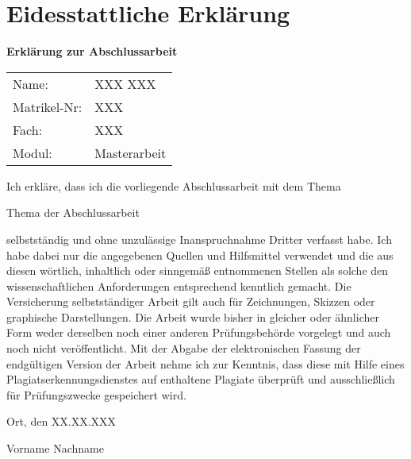 \chapter{Eidesstattliche Erklärung}
\begin{flushleft}
\Large \textbf{Erklärung zur Abschlussarbeit}
\end{flushleft}


\vspace{1cm}

\begin{tabular}[c]{p{5cm}l}
		Name: & XXX XXX\\
		Matrikel-Nr: & XXX\\
		Fach: & XXX\\
		Modul: & Masterarbeit\\
\end{tabular}

\vspace{1cm}

\begin{flushleft}
Ich erkläre, dass ich die vorliegende Abschlussarbeit mit dem Thema
\end{flushleft}

\begin{center}
	{\LARGE Thema der Abschlussarbeit}
\end{center}

selbstständig und ohne unzulässige Inanspruchnahme Dritter verfasst habe. Ich habe dabei nur die angegebenen Quellen und Hilfsmittel verwendet und die aus diesen wörtlich, inhaltlich oder sinngemäß entnommenen Stellen als solche den wissenschaftlichen Anforderungen entsprechend kenntlich gemacht. Die Versicherung selbstständiger Arbeit gilt auch für Zeichnungen, Skizzen oder graphische Darstellungen. Die Arbeit wurde bisher in gleicher oder ähnlicher Form weder derselben noch einer anderen Prüfungsbehörde vorgelegt und auch noch nicht veröffentlicht. Mit der Abgabe der elektronischen Fassung der endgültigen Version der Arbeit nehme ich zur Kenntnis, dass diese mit Hilfe eines Plagiatserkennungsdienstes auf enthaltene Plagiate überprüft und ausschließlich für Prüfungszwecke gespeichert wird.
 
\vspace{1cm}

Ort, den XX.XX.XXX

\vspace{2cm}

Vorname Nachname
